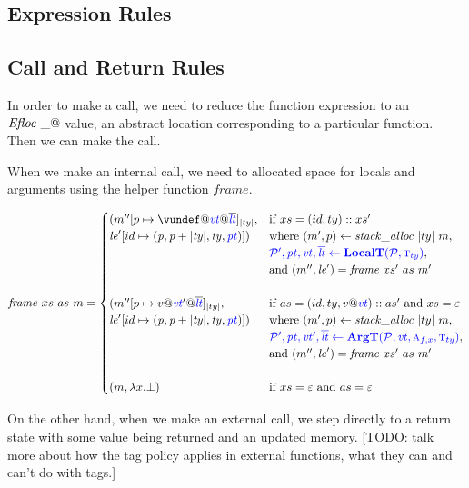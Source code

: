 \documentclass{llncs}
\begin{document}
{\subsection{Expression Rules}

\expressions

\subsection{Call and Return Rules}

In order to make a call, we need to reduce the function expression to an \(\mathit{Efloc} ~ \_@\) value, an
abstract location corresponding to a particular function. Then we can make the call.

\callexprstep

When we make an internal call, we need to allocated space for locals and arguments using the helper function
\(\mathit{frame}\).

\[\mathit{frame} ~ xs ~ as ~ \mem =
\begin{cases}
  (\mem''[p \mapsto \vundef@\vt@\overline{\lt}]_{|ty|}, & \textnormal{if } xs = (id,ty)::xs' \\
  \lenv'[id \mapsto (\mathit{p, p+|ty|,ty,\pt})]) &
  \textnormal{where } (\mem',p) \leftarrow \mathit{stack\_alloc} ~ |ty| ~ \mem, \\
  & \trule{\localtres}{\localt}, \\
  & \textnormal{and } (\mem'',\lenv') = \mathit{frame} ~ xs' ~ as ~ m' \\ 
  \\
  (\mem''[p \mapsto v@\vt'@\overline{\lt}]_{|ty|}, & \textnormal{if } as = (id,ty,v @ \vt)::as' \textnormal{ and } xs = \varepsilon \\
  \lenv'[id \mapsto (\mathit{p, p+|ty|,ty,\pt})]) &
  \textnormal{where } (\mem',p) \leftarrow \mathit{stack\_alloc} ~ |ty| ~ \mem, \\
  & \trule{\argtres}{\argt}, \\
  & \textnormal{and } (\mem'',\lenv') = \mathit{frame} ~ xs' ~ as ~ m' \\
  \\
  (\mem, \lambda x . \bot) & \textnormal{if } xs = \varepsilon \textnormal{ and } as = \varepsilon \\
\end{cases}\]

\callstep

On the other hand, when we make an external call, we step directly to a return state with some value
being returned and an updated memory. [TODO: talk more about how the tag policy applies in external
  functions, what they can and can't do with tags.]

}
\end{document}

